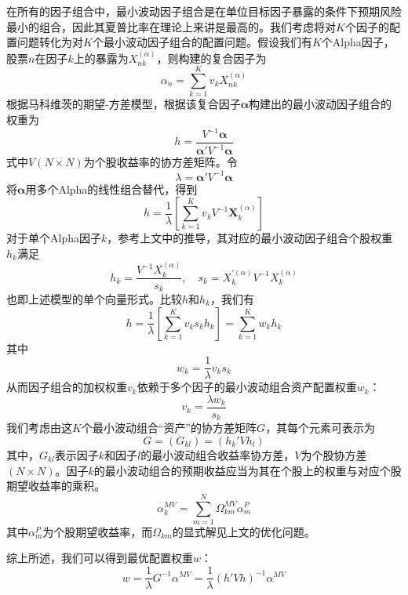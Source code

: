 \documentclass[11pt]{article}
\begin{document}
\begin{enumerate}
  在所有的因子组合中，最小波动因子组合是在单位目标因子暴露的条件下预期风险最小的组合，因此其夏普比率在理论上来讲是最高的。我们考虑将对$K$个因子的配置问题转化为对$K$个最小波动因子组合的配置问题。假设我们有$K$个Alpha因子，股票$n$在因子$k$上的暴露为$X_{nk}^{(\alpha)}$，则构建的复合因子为
  $$\alpha_n=\sum_{k=1}^K v_k X_{nk}^{(\alpha)}$$ 根据马科维茨的期望-方差模型，根据该复合因子$\bm{\alpha}$构建出的最小波动因子组合的权重为
  $$h=\frac{V^{-1}\bm{\alpha}}{\bm{\alpha}'V^{-1}\bm{\alpha}}$$ 式中$V (N\times N)$为个股收益率的协方差矩阵。令
  $$\lambda =\bm{\alpha}'V^{-1}\bm{\alpha} $$ 将$\bm{\alpha}$用多个Alpha的线性组合替代，得到
  $$h=\frac{1}{\lambda}\left[\sum_{k=1}^K v_k V^{-1}\bm{X}_k^{(\alpha)} \right]$$ 对于单个Alpha因子$k$，参考上文中的推导，其对应的最小波动因子组合个股权重$h_k$满足
  $$h_k=\frac{V^{-1}X_k^{(\alpha)}}{s_k}, \quad s_k=X_k^{'(\alpha)}V^{-1}X_k^{(\alpha)}$$ 也即上述模型的单个向量形式。比较$h$和$h_k$，我们有
  $$h=\frac{1}{\lambda}\left[\sum_{k=1}^K v_k s_k h_k \right]=\sum_{k=1}^K w_k h_k$$ 其中
  $$w_k=\frac{1}{\lambda} v_k s_k$$ 从而因子组合的加权权重$v_k$依赖于多个因子的最小波动组合资产配置权重$w_k$：
  $$v_k=\frac{\lambda w_k}{s_k}$$ 我们考虑由这$K$个最小波动组合“资产”的协方差矩阵$G$，其每个元素可表示为
  $$G=(G_{kl})=(h_k' V h_l)$$ 其中，$G_{kl}$表示因子$k$和因子$l$的最小波动组合收益率协方差，$V$为个股协方差$(N\times N)$。因子$k$的最小波动组合的预期收益应当为其在个股上的权重与对应个股期望收益率的乘积。$$\alpha_k^{MV}=\sum_{m=1}^N \Omega_{km}^{MV}\alpha_m^P$$ 其中$\alpha_m^P$为个股期望收益率，而$\Omega_{km}$的显式解见上文的优化问题。

  综上所述，我们可以得到最优配置权重$w$：
  $$w=\frac{1}{\lambda}G^{-1}\alpha^{MV}=\frac{1}{\lambda} (h'Vh)^{-1}\alpha^{MV}$$
\end{enumerate}
\end{document}
